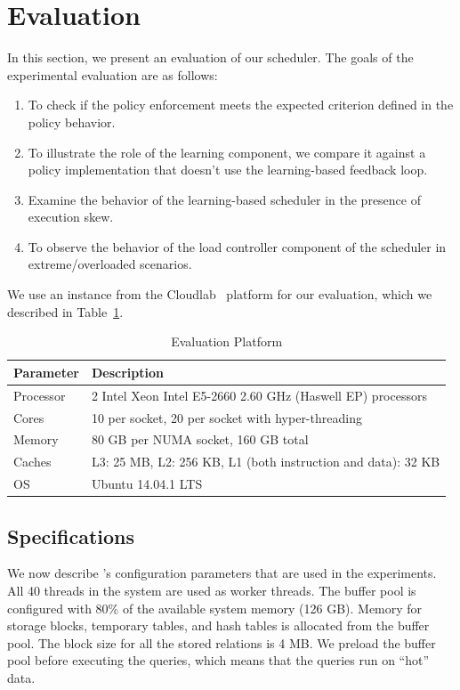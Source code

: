\section{Evaluation}\label{sec:eval}
In this section, we present an evaluation of our scheduler. 
The goals of the experimental evaluation are as follows:
\begin{enumerate}
\item To check if the policy enforcement meets the expected criterion defined in 
the policy behavior. 
\item To illustrate the role of the learning component, we compare it against a policy implementation that doesn't use the learning-based feedback loop. 
\item Examine the behavior of the learning-based scheduler in the presence of 
execution skew. 
\item To observe the behavior of the load controller component of the scheduler in extreme/overloaded scenarios.
\end{enumerate}

We use an instance from the Cloudlab~\cite{RicciEide:login14} platform for our evaluation,
which we described in Table~\ref{table:hardware}.

\begin{table}[]
\centering
\begin{tabular}{|p{1cm}|p{6.9cm}|}
\hline
\textbf{Parameter} & \textbf{Description} \\ \hline
Processor & 2 Intel Xeon Intel E5-2660 2.60 GHz (Haswell EP) processors\\ \hline
Cores & 10 per socket, 20 per socket with hyper-threading \\ \hline
Memory & 80 GB per NUMA socket, 160 GB total \\ \hline
Caches & L3: 25 MB, L2: 256 KB, L1 (both instruction and data): 32 KB \\ \hline
OS & Ubuntu 14.04.1 LTS \\ \hline
\end{tabular}
\caption{Evaluation Platform}
\label{table:hardware}
\end{table}
\subsection{\sys{} Specifications}
We now describe \sys{}'s configuration parameters that are  used in the experiments. 
All 40 threads in the system are used as worker threads.
The buffer pool is configured with 80\% of the available system memory (126 GB). 
Memory for storage blocks, temporary tables, and hash tables is allocated from the buffer 
pool.
The block size for all the stored relations is 4 MB.
We preload the buffer pool before executing the queries, which means that the queries run on ``hot'' data. 

